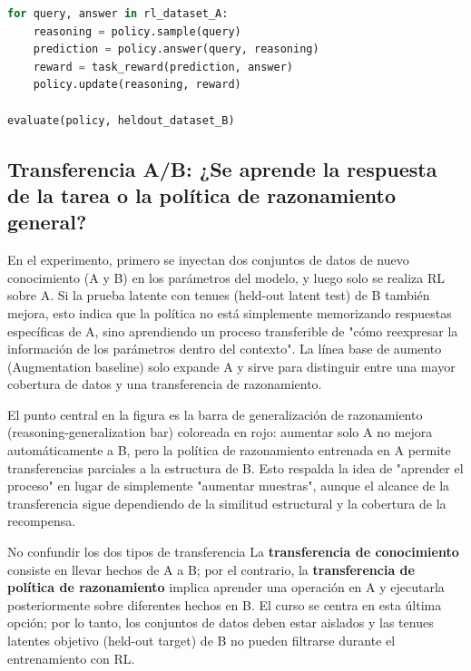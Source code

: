 \begin{lstlisting}[language=Python,caption={Bucle de entrenamiento abstracto para aprender test-time regeneration con RL}]
for query, answer in rl_dataset_A:
    reasoning = policy.sample(query)
    prediction = policy.answer(query, reasoning)
    reward = task_reward(prediction, answer)
    policy.update(reasoning, reward)

evaluate(policy, heldout_dataset_B)
\end{lstlisting}

\subsection{Transferencia A/B: ¿Se aprende la respuesta de la tarea o la política de razonamiento general?}

En el experimento, primero se inyectan dos conjuntos de datos de nuevo conocimiento (A y B) en los parámetros del modelo, y luego solo se realiza RL sobre A. Si la prueba latente con tenues (held-out latent test) de B también mejora, esto indica que la política no está simplemente memorizando respuestas específicas de A, sino aprendiendo un proceso transferible de "cómo reexpresar la información de los parámetros dentro del contexto". La línea base de aumento (Augmentation baseline) solo expande A y sirve para distinguir entre una mayor cobertura de datos y una transferencia de razonamiento.



El punto central en la figura es la barra de generalización de razonamiento (reasoning-generalization bar) coloreada en rojo: aumentar solo A no mejora automáticamente a B, pero la política de razonamiento entrenada en A permite transferencias parciales a la estructura de B. Esto respalda la idea de "aprender el proceso" en lugar de simplemente "aumentar muestras", aunque el alcance de la transferencia sigue dependiendo de la similitud estructural y la cobertura de la recompensa.

\begin{knowledgebox}{No confundir los dos tipos de transferencia}
La \textbf{transferencia de conocimiento} consiste en llevar hechos de A a B; por el contrario, la \textbf{transferencia de política de razonamiento} implica aprender una operación en A y ejecutarla posteriormente sobre diferentes hechos en B. El curso se centra en esta última opción; por lo tanto, los conjuntos de datos deben estar aislados y las tenues latentes objetivo (held-out target) de B no pueden filtrarse durante el entrenamiento con RL.
\end{knowledgebox}

